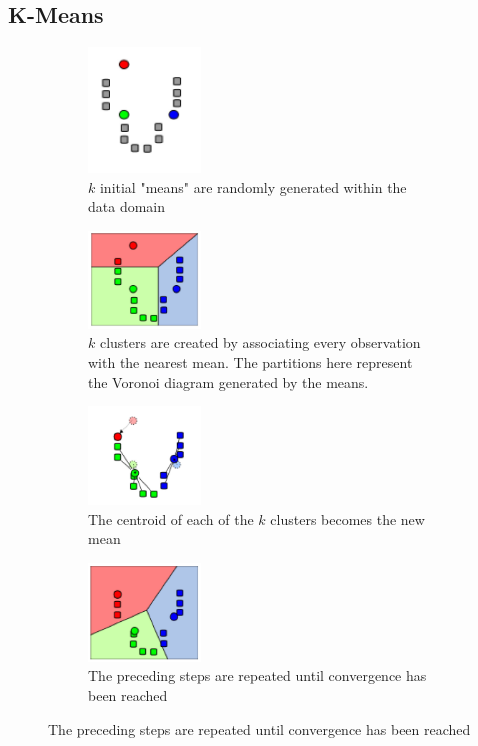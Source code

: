 \documentclass[11pt]{article}
\theoremstyle{definition}
\begin{document}
\subsection{K-Means}
\begin{figure}[H]
	\begin{subfigure}{0.45\linewidth}
		\centering
		\includegraphics[width=3cm]{kmeans01}
		\caption{$k$ initial "means" are randomly generated within the data domain}
	\end{subfigure}
	\hspace{\fill}
	\begin{subfigure}{0.45\linewidth}
		\centering
		\includegraphics[width=3cm]{kmeans02}
		\caption{$k$ clusters are created by associating every observation with the nearest mean. The partitions here represent the Voronoi diagram generated by the means.}
	\end{subfigure}
	\begin{subfigure}{0.45\linewidth}
		\centering
		\includegraphics[width=3cm]{kmeans03}
		\caption{The centroid of each of the $k$ clusters becomes the new mean}
	\end{subfigure}
	\hspace{\fill}
	\begin{subfigure}{0.45\linewidth}
		\centering
		\includegraphics[width=3cm]{kmeans04}
		\caption{The preceding steps are repeated until convergence has been reached}
	\end{subfigure}
\end{figure}
\end{document}
